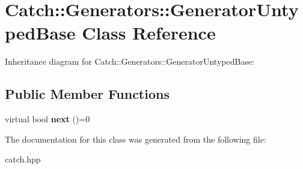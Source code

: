 \hypertarget{classCatch_1_1Generators_1_1GeneratorUntypedBase}{}\section{Catch\+:\+:Generators\+:\+:Generator\+Untyped\+Base Class Reference}
\label{classCatch_1_1Generators_1_1GeneratorUntypedBase}


Inheritance diagram for Catch\+:\+:Generators\+:\+:Generator\+Untyped\+Base\+:
\subsection*{Public Member Functions}
\begin{DoxyCompactItemize}
\item 
\mbox{\label{classCatch_1_1Generators_1_1GeneratorUntypedBase_aeed3c0cd6233c5f553549e453b8d6638}} 
virtual bool {\bfseries next} ()=0
\end{DoxyCompactItemize}


The documentation for this class was generated from the following file\+:\begin{DoxyCompactItemize}
\item 
catch.\+hpp\end{DoxyCompactItemize}
